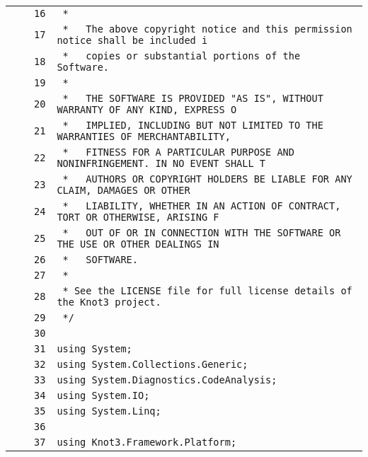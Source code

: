 \documentclass[a4paper,10pt]{article}
\begin{document}
\begin{longtable}[l]{lrrl}
\cellcolor{gray} &  & \verb~16~ & \verb~ *~\\
\cellcolor{gray} &  & \verb~17~ & \verb~ *   The above copyright notice and this permission notice shall be included i~\\
\cellcolor{gray} &  & \verb~18~ & \verb~ *   copies or substantial portions of the Software.~\\
\cellcolor{gray} &  & \verb~19~ & \verb~ *~\\
\cellcolor{gray} &  & \verb~20~ & \verb~ *   THE SOFTWARE IS PROVIDED "AS IS", WITHOUT WARRANTY OF ANY KIND, EXPRESS O~\\
\cellcolor{gray} &  & \verb~21~ & \verb~ *   IMPLIED, INCLUDING BUT NOT LIMITED TO THE WARRANTIES OF MERCHANTABILITY,~\\
\cellcolor{gray} &  & \verb~22~ & \verb~ *   FITNESS FOR A PARTICULAR PURPOSE AND NONINFRINGEMENT. IN NO EVENT SHALL T~\\
\cellcolor{gray} &  & \verb~23~ & \verb~ *   AUTHORS OR COPYRIGHT HOLDERS BE LIABLE FOR ANY CLAIM, DAMAGES OR OTHER~\\
\cellcolor{gray} &  & \verb~24~ & \verb~ *   LIABILITY, WHETHER IN AN ACTION OF CONTRACT, TORT OR OTHERWISE, ARISING F~\\
\cellcolor{gray} &  & \verb~25~ & \verb~ *   OUT OF OR IN CONNECTION WITH THE SOFTWARE OR THE USE OR OTHER DEALINGS IN~\\
\cellcolor{gray} &  & \verb~26~ & \verb~ *   SOFTWARE.~\\
\cellcolor{gray} &  & \verb~27~ & \verb~ *~\\
\cellcolor{gray} &  & \verb~28~ & \verb~ * See the LICENSE file for full license details of the Knot3 project.~\\
\cellcolor{gray} &  & \verb~29~ & \verb~ */~\\
\cellcolor{gray} &  & \verb~30~ & \verb~~\\
\cellcolor{gray} &  & \verb~31~ & \verb~using System;~\\
\cellcolor{gray} &  & \verb~32~ & \verb~using System.Collections.Generic;~\\
\cellcolor{gray} &  & \verb~33~ & \verb~using System.Diagnostics.CodeAnalysis;~\\
\cellcolor{gray} &  & \verb~34~ & \verb~using System.IO;~\\
\cellcolor{gray} &  & \verb~35~ & \verb~using System.Linq;~\\
\cellcolor{gray} &  & \verb~36~ & \verb~~\\
\cellcolor{gray} &  & \verb~37~ & \verb~using Knot3.Framework.Platform;~\\

\end{longtable}
\end{document}
